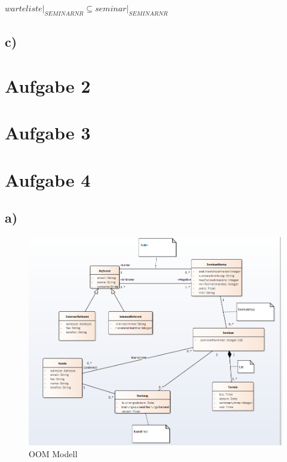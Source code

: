 \documentclass[10pt,a4paper]{article}
\begin{document}
$warteliste\vert_{SEMINARNR} \subseteq seminar\vert_{SEMINARNR}$

\newpage
\subsection{c)}



\section{Aufgabe 2}


\section{Aufgabe 3}


\section{Aufgabe 4}
\subsection{a)}


\begin{figure}[ht!]
	\includegraphics[scale=0.6]{Bilder/diagram02.PNG}
	\caption{OOM Modell}
	\label{er:1}
\end{figure}
\end{document}
